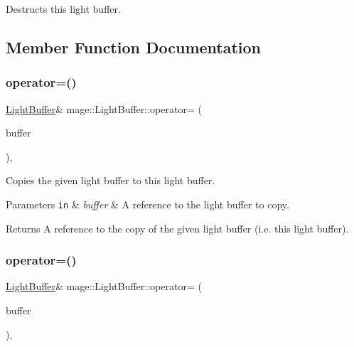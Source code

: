 Destructs this light buffer. 

\subsection{Member Function Documentation}
\hypertarget{structmage_1_1_light_buffer_ad89633dcca7fc573a3890f79d840ca7f}{}\label{structmage_1_1_light_buffer_ad89633dcca7fc573a3890f79d840ca7f} 
\subsubsection{\texorpdfstring{operator=()}{operator=()}\hspace{0.1cm}{\footnotesize\ttfamily [1/2]}}
{\footnotesize\ttfamily \hyperlink{structmage_1_1_light_buffer}{Light\+Buffer}\& mage\+::\+Light\+Buffer\+::operator= (\begin{DoxyParamCaption}\item[{const \hyperlink{structmage_1_1_light_buffer}{Light\+Buffer} \&}]{buffer }\end{DoxyParamCaption})\hspace{0.3cm}{\ttfamily [default]}, {\ttfamily [noexcept]}}

Copies the given light buffer to this light buffer.


\begin{DoxyParams}[1]{Parameters}
\mbox{\tt in}  & {\em buffer} & A reference to the light buffer to copy. \\
\hline
\end{DoxyParams}
\begin{DoxyReturn}{Returns}
A reference to the copy of the given light buffer (i.\+e. this light buffer). 
\end{DoxyReturn}
\hypertarget{structmage_1_1_light_buffer_ab6b941170192e5ced1885b862cfcc678}{}\label{structmage_1_1_light_buffer_ab6b941170192e5ced1885b862cfcc678} 
\subsubsection{\texorpdfstring{operator=()}{operator=()}\hspace{0.1cm}{\footnotesize\ttfamily [2/2]}}
{\footnotesize\ttfamily \hyperlink{structmage_1_1_light_buffer}{Light\+Buffer}\& mage\+::\+Light\+Buffer\+::operator= (\begin{DoxyParamCaption}\item[{\hyperlink{structmage_1_1_light_buffer}{Light\+Buffer} \&\&}]{buffer }\end{DoxyParamCaption})\hspace{0.3cm}{\ttfamily [default]}, {\ttfamily [noexcept]}}

